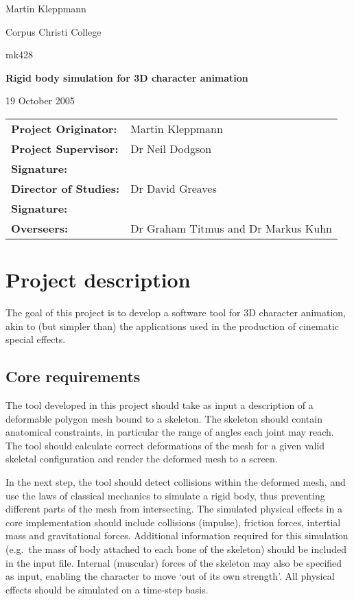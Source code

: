 %

{\hfill Martin Kleppmann}

{\hfill Corpus Christi College}

{\hfill mk428}

\vspace{3cm}
\centerline{\Large\bf Rigid body simulation for 3D character animation}
\vspace{1cm}
\centerline{19 October 2005}

\vspace{3cm}
\begin{tabular}{ll}
{\bf Project Originator:} & Martin Kleppmann \vspace{1.5cm}\\
{\bf Project Supervisor:} & Dr Neil Dodgson \vspace{0.5cm}\\
{\bf Signature:} & \vspace{1.5cm}\\
{\bf Director of Studies:} & Dr David Greaves \vspace{0.5cm}\\
{\bf Signature:} & \vspace{1.5cm}\\
{\bf Overseers:} & Dr Graham Titmus and Dr Markus Kuhn\\
\end{tabular}
\newpage

\section*{Project description}

The goal of this project is to develop a software tool for 3D character
animation, akin to (but simpler than) the applications used in the
production of cinematic special effects.

\subsection*{Core requirements}

The tool developed in this project should take as input a description
of a deformable polygon mesh bound to a skeleton. The skeleton should
contain anatomical constraints, in particular the range of angles each
joint may reach. The tool should calculate correct deformations of the
mesh for a given valid skeletal configuration and render the deformed
mesh to a screen.

In the next step, the tool should detect collisions within the
deformed mesh, and use the laws of classical mechanics to simulate a
rigid body, thus preventing different parts of the mesh from
intersecting. The simulated physical effects in a core implementation
should include collisions (impulse), friction forces, intertial mass
and gravitational forces. Additional information required for this
simulation (e.g.\ the mass of body attached to each bone of the
skeleton) should be included in the input file. Internal (muscular)
forces of the skeleton may also be specified as input, enabling the
character to move `out of its own strength'. All physical effects
should be simulated on a time-step basis.


